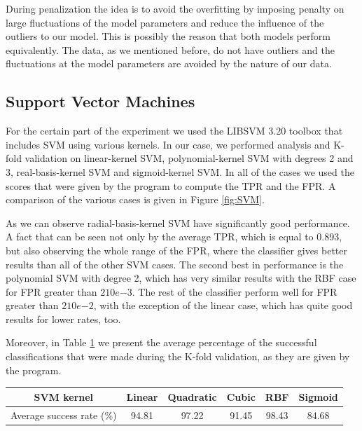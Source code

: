 \noindent During penalization the idea is to avoid the overfitting by imposing penalty on large fluctuations of the model parameters and reduce the influence of the outliers to our model. This is possibly the reason that both models perform equivalently. The data, as we mentioned before, do not have outliers and the fluctuations at the model parameters are avoided by the nature of our data.

\subsection{Support Vector Machines}
\noindent For the certain part of the experiment we used the LIBSVM 3.20 toolbox that includes SVM using various kernels. In our case, we performed analysis and K-fold validation on linear-kernel SVM, polynomial-kernel SVM with degrees 2 and 3, real-basis-kernel SVM and sigmoid-kernel SVM. In all of the cases we used the scores that were given by the program to compute the TPR and the FPR. A comparison of the various cases is given in Figure \ref{fig:SVM}.

\noindent As we can observe radial-basis-kernel SVM have significantly good performance. A fact that can be seen not only by the average TPR, which is equal to 0.893, but also observing the whole range of the FPR, where the classifier gives better results than all of the other SVM cases. The second best in performance is the polynomial SVM with degree 2, which has very similar results with the RBF case for FPR greater than $2 10e{-3}$. The rest of the classifier perform well for FPR greater than $2 10e{-2}$, with the exception of the linear case, which has quite good results for lower rates, too.

\noindent Moreover, in Table \ref{table:SVM_success} we present the average percentage of the successful classifications that were made during the K-fold validation, as they are given by the program.

\begin{table}[h]
  \centering
  \begin{tabular}{ | c | c | c | c | c | c |}
  \hline
  SVM kernel & Linear & Quadratic & Cubic & RBF & Sigmoid \\ \hline
  Average success rate (\%) & 94.81 & 97.22 & 91.45 & 98.43 & 84.68 \\ \hline
  \end{tabular}
  \label{table:SVM_success}
\end{table}
    
